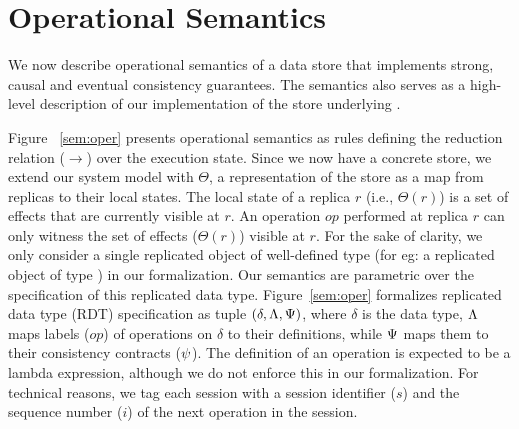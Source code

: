 \section{Operational Semantics}
\label{sec:store-opsem}

\renewcommand{\auxred}[4]{#1 \vdash #2 \;\xhookrightarrow{#3}\; #4 }

We now describe operational semantics of a data store that implements
strong, causal and eventual consistency guarantees. The semantics also
serves as a high-level description of our implementation of the store
underlying \name.

Figure ~\ref{sem:oper} presents operational semantics as rules
defining the reduction relation ($\xrightarrow{}$) over the execution
state.  Since we now have a concrete store, we extend our system model
with $\Theta$, a representation of the store as a map from replicas to
their local states. The local state of a replica $r$ (i.e.,
$\Theta(r)$) is a set of effects that are currently visible at $r$.
An operation $op$ performed at replica $r$ can only witness the set of
effects ($\Theta(r)$) visible at $r$. For the sake of clarity, we only
consider a single replicated object of well-defined type (for eg: a
replicated object of type ) in our formalization.  Our
semantics are parametric over the specification of this replicated
data type. Figure~\ref{sem:oper} formalizes replicated data type (RDT)
specification as tuple $(\delta,\Lambda,\Psi)$, where $\delta$ is the
data type, $\Lambda$ maps labels ($op$) of operations on $\delta$ to
their definitions, while $\Psi$ maps them to their consistency
contracts ($\psi$). The definition of an operation is expected to be a
lambda expression, although we do not enforce this in our
formalization. For technical reasons, we tag each session with a
session identifier ($s$) and the sequence number ($i$) of the next
operation in the session.

